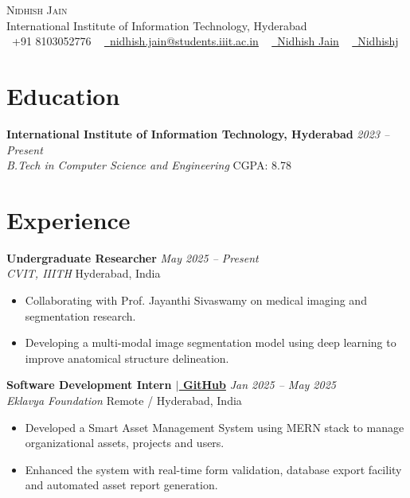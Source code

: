 \documentclass[letterpaper,11pt]{article}
\newcommand{\resumeItem}[1]{
  \item\small{
    {#1 \vspace{-2pt}}
  }
}
\newcommand{\resumeItemListStart}{\begin{itemize}[leftmargin=0.15in, topsep=2pt, partopsep=0pt, parsep=0pt, itemsep=2pt]}
\newcommand{\resumeItemListEnd}{\end{itemize}\vspace{-5pt}}
\begin{document}
\begin{center}
    {\Huge \scshape Nidhish Jain} \\ \vspace{1pt}
    International Institute of Information Technology, Hyderabad \\ \vspace{1pt}
    \small \raisebox{-0.1\height}\faPhone\ +91 8103052776 ~ \href{mailto:nidhish.jain@students.iiit.ac.in}{\raisebox{-0.2\height}\faEnvelope\  \underline{nidhish.jain@students.iiit.ac.in}} ~ 
    \href{https://www.linkedin.com/in/nidhish-jain-43ab52280/}{\raisebox{-0.2\height}\faLinkedin\ \underline{Nidhish Jain}}  ~
    \href{https://github.com/Nidhishj}{\raisebox{-0.2\height}\faGithub\ \underline{Nidhishj}}
\end{center}

\section*{Education}
\textbf{International Institute of Information Technology, Hyderabad} \hfill \textit{2023 -- Present} \\
\small{\textit{B.Tech in Computer Science and Engineering} \hfill CGPA: 8.78}

\section*{Experience}
\textbf{Undergraduate Researcher} \hfill \textit{May 2025 -- Present} \\
\small{\textit{CVIT, IIITH} \hfill Hyderabad, India} \\
\resumeItemListStart
\resumeItem{Collaborating with Prof. Jayanthi Sivaswamy on medical imaging and segmentation research.}
\resumeItem{Developing a multi-modal image segmentation model using deep learning to improve anatomical structure delineation.}
\resumeItemListEnd
\vspace{8pt}
\textbf{Software Development Intern $|$\href{https://github.com/Nidhishj/Asset_Management_System}{ GitHub}} \hfill \textit{Jan 2025 -- May 2025} \\
\small{\textit{Eklavya Foundation} \hfill Remote / Hyderabad, India} \\
\resumeItemListStart
\resumeItem{Developed a Smart Asset Management System using MERN stack to manage organizational assets, projects and users.}
\resumeItem{Enhanced the system with real-time form validation, database export facility and automated asset report generation.}
\resumeItemListEnd
\end{document}
